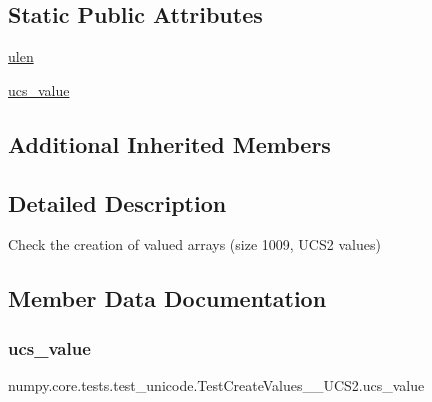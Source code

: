 \subsection*{Static Public Attributes}
\begin{DoxyCompactItemize}
\item 
\hyperlink{classnumpy_1_1core_1_1tests_1_1test__unicode_1_1TestCreateValues__1009__UCS2_a5d29798b80f8931c1216b010cc074441}{ulen}
\item 
\hyperlink{classnumpy_1_1core_1_1tests_1_1test__unicode_1_1TestCreateValues__1009__UCS2_a6898f390dbce0738c7460eed4335b094}{ucs\+\_\+value}
\end{DoxyCompactItemize}
\subsection*{Additional Inherited Members}


\subsection{Detailed Description}
\begin{DoxyVerb}Check the creation of valued arrays (size 1009, UCS2 values)\end{DoxyVerb}
 

\subsection{Member Data Documentation}
\mbox{\label{classnumpy_1_1core_1_1tests_1_1test__unicode_1_1TestCreateValues__1009__UCS2_a6898f390dbce0738c7460eed4335b094}} 
\subsubsection{\texorpdfstring{ucs\+\_\+value}{ucs\_value}}
{\footnotesize\ttfamily numpy.\+core.\+tests.\+test\+\_\+unicode.\+Test\+Create\+Values\+\_\+\_\+\+U\+C\+S2.\+ucs\+\_\+value\hspace{0.3cm}{\ttfamily [static]}}

